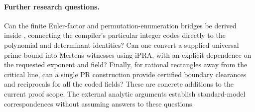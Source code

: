 \paragraph{Further research questions.}
Can the finite Euler-factor and permutation-enumeration bridges be derived inside , connecting the compiler's particular integer codes directly to the polynomial and determinant identities? Can one convert a supplied universal prime bound into Mertens witnesses using iPRA, with an explicit dependence on the requested exponent and field? Finally, for rational rectangles away from the critical line, can a single PR construction provide certified boundary clearances and reciprocals for all the coded fields? These are concrete additions to the current proof scope. The external analytic arguments establish standard-model correspondences without assuming answers to these questions.
